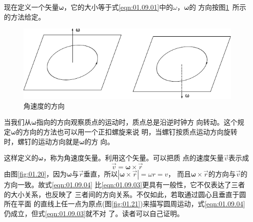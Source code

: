 现在定义一个矢量$\symbf{\omega}$，它的大小等于式\eqref{eqn:01.09.01}中的$\omega$，$\symbf{\omega}$的
方向按图\ref{fig:01.19}~所示的方法给定。
\begin{figure}[!h]
    \includegraphics{figure/fig01.19}
    \caption{角速度的方向}
    \label{fig:01.19}
    \vspace{-1.2em}
\end{figure}

\noindent 当我们从$\symbf{\omega}$指向的方向观察质点的运动时，质点总是沿逆时钟方
向转动。这个规定$ \symbf{\omega}$的方向的方法也可以用一个正扣螺旋来说
明，当螺钉按质点运动方向旋转时，螺钉的运动方向就是$ \symbf{\omega}$的方
向。

这样定义的$ \symbf{\omega}$，称为角速度矢量。利用这个矢量。可以把质
点的速度矢量$\vec{v}$表示成
\begin{equation}\label{eqn:01.09.04}
    \vec{v}= \symbf{\omega}\times \vec{r}
\end{equation}
由图\ref{fig:01.20}，因为$ \symbf{\omega}$与$\vec{r}$垂直，所以$| \symbf{\omega}\times\vec{r}|=\omega r=v$，
而且$ \symbf{\omega}\times\vec{r}$的方向与$\vec{v}$的方向一致。故式\eqref{eqn:01.09.04}
比\eqref{eqn:01.09.03}更具有一般性，它不仅表达了三者的大小关系，也反映了
三者间的方向关系。不仅如此，若取通过圆心且垂直于圆所在平面
的直线上任一点为原点(图\ref{fig:01.21})来描写圆周运动，式\eqref{eqn:01.09.04}仍成立，但式\eqref{eqn:01.09.03}就不对
\clearpage
\noindent 了。读者可以自己证明。

